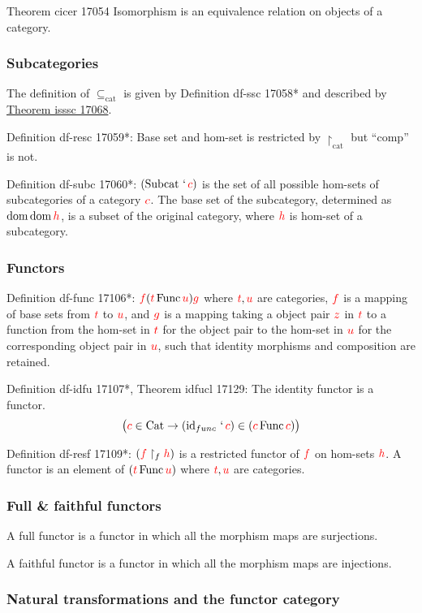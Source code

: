 \documentclass[12pt, letterpaper]{article}
\newcommand{\Cat}{\operatorname{Cat}}
\newcommand{\ssc}{\subseteq_\mathrm{cat}}
\newcommand{\resc}{\restriction_\mathrm{cat}}
\newcommand{\Subcat}{\operatorname{Subcat}}
\newcommand{\Func}{\operatorname{Func}}
\newcommand{\idfu}{\operatorname{id}_{func}}
\newcommand{\resf}{\restriction_{f}}
\newcommand{\red}[1]{{\color{red} #1}}
\newcommand{\ra}{\rightarrow}
\newcommand{\setvar}{\red}
\newcommand{\scc}{\setvar{c}}
\newcommand{\sff}{\setvar{f}}
\newcommand{\sg}{\setvar{g}}
\newcommand{\sh}{\setvar{h}}
\newcommand{\st}{\setvar{t}}
\newcommand{\su}{\setvar{u}}
\newcommand{\sz}{\setvar{z}}
\newcommand{\at}{\,`\,}
\newcommand{\dom}{{\operatorname{dom}\,}}
\theoremstyle{definition}
\theoremstyle{remark}
\theoremstyle{definition}
\theoremstyle{plain}
\begin{document}
	Theorem	cicer 17054	Isomorphism is an equivalence relation on objects of a category.
	
	\subsubsection{Subcategories}
	The definition of $\ssc$ is given by Definition	df-ssc 17058* and described by \href{https://us.metamath.org/mpeuni/isssc.html}{Theorem isssc 17068}.
	
	Definition	df-resc 17059*: Base set and hom-set is restricted by $\resc$ but ``comp'' is not.
	
	Definition	df-subc 17060*: $(\Subcat\at\scc)$ is the set of all possible hom-sets of subcategories of a category $\scc$. The base set of the subcategory, determined as $\dom\dom\sh$, is a subset of the original category, where $\sh$ is hom-set of a subcategory.
	
	\subsubsection{Functors}
	
	Definition	df-func 17106*:
	$\sff(\st\Func\su)\sg$ where $\st,\su$ are categories, $\sff$ is a mapping of base sets from $\st$ to $\su$,
	and $\sg$ is a mapping taking a object pair $\sz$ in $\st$ to a function from the hom-set in $\st$ for the object pair to the hom-set in $\su$ for the corresponding object pair in $\su$, such that identity morphisms and composition are retained.
	
	Definition	df-idfu 17107*, Theorem	idfucl 17129: The identity functor is a functor.
	\[ \big(\scc\in\Cat\ra (\idfu\at\scc)\in(\scc\Func\scc)\big) \]
	
	Definition	df-resf 17109*: $(\sff\resf\sh)$ is a restricted functor of $\sff$ on hom-sets $\sh$. A functor is an element of $(\st\Func\su)$ where $\st,\su$ are categories.
	
	\subsubsection{Full \& faithful functors}
	
	A full functor is a functor in which all the morphism maps are surjections.
	
	A faithful functor is a functor in which all the morphism maps are injections.
	
	\subsubsection{Natural transformations and the functor category}
	
\end{document}
